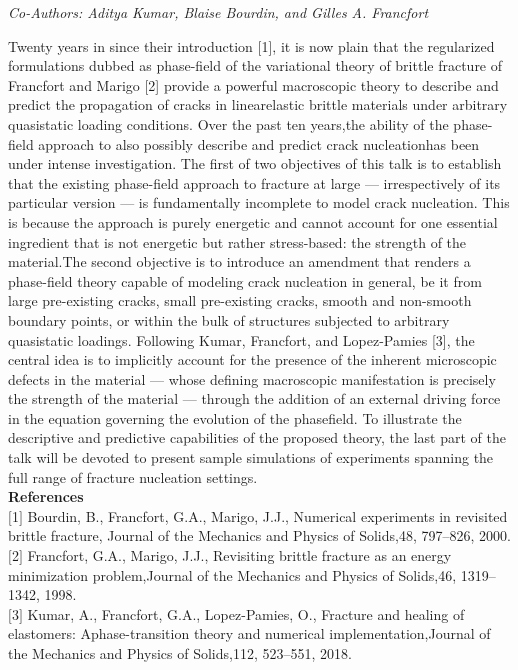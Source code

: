 \begin{center}
\textit{Co-Authors: Aditya Kumar, Blaise Bourdin, and Gilles A. Francfort}
\end{center} 
Twenty years in since their introduction [1], it is now plain that the regularized formulations dubbed as phase-field of the variational theory of brittle fracture of Francfort and Marigo [2] provide a powerful macroscopic theory to describe and predict the propagation of cracks in linearelastic brittle materials under arbitrary quasistatic loading conditions. Over the past ten years,the ability of the phase-field approach to also possibly describe and predict crack nucleationhas been under intense investigation. The first of two objectives of this talk is to establish that the existing phase-field approach to fracture at large — irrespectively of its particular version — is fundamentally incomplete to model crack nucleation. This is because the approach is purely energetic and cannot account for one essential ingredient that is not energetic but rather stress-based: the strength of the material.The second objective is to introduce an amendment that renders a phase-field theory capable of modeling crack nucleation in general, be it from large pre-existing cracks, small pre-existing cracks, smooth and non-smooth boundary points, or within the bulk of structures subjected to arbitrary quasistatic loadings. Following Kumar, Francfort, and Lopez-Pamies [3], the central idea is to implicitly account for the presence of the inherent microscopic defects in the material — whose defining macroscopic manifestation is precisely the strength of the material — through the addition of an external driving force in the equation governing the evolution of the phasefield. To illustrate the descriptive and predictive capabilities of the proposed theory, the last part of the talk will be devoted to present sample simulations of experiments spanning the full range of fracture nucleation settings.\\

\noindent\textbf{References}\\
$[$1$]$ Bourdin, B., Francfort, G.A., Marigo, J.J., Numerical experiments in revisited brittle fracture, Journal of the Mechanics and Physics of Solids,48, 797–826, 2000.\\\newline
$[$2$]$ Francfort, G.A., Marigo, J.J., Revisiting brittle fracture as an energy minimization problem,Journal of the Mechanics and Physics of Solids,46, 1319–1342, 1998.\\\newline
$[$3$]$ Kumar, A., Francfort, G.A., Lopez-Pamies, O., Fracture and healing of elastomers: Aphase-transition theory and numerical implementation,Journal of the Mechanics and Physics of Solids,112, 523–551, 2018.



